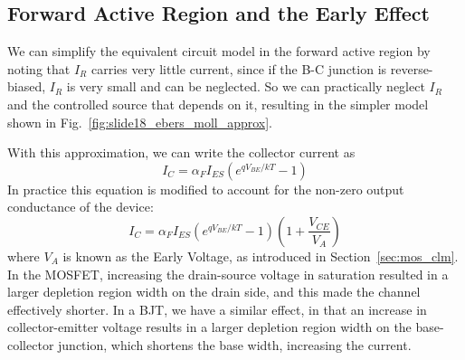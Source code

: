 \subsection{Forward Active Region and the Early Effect}

We can simplify the equivalent circuit model in the forward active region by noting that $I_R$ carries very little current, since if the B-C junction is reverse-biased, $I_R$ is very small and can be neglected.  So we can practically neglect $I_R$ and the controlled source that depends on it, resulting in the simpler model shown in Fig.~\ref{fig:slide18_ebers_moll_approx}.

With this approximation, we can write the collector current as
%
\begin{equation}
	I_C = \alpha_F I_{ES} \left( e^{qV_{BE}/kT} -1 \right)
\end{equation}
%
In practice this equation is modified to account for the non-zero output conductance of the device:
%
\begin{equation}
	I_C = \alpha_F I_{ES} \left( e^{qV_{BE}/kT} -1 \right) \left( 1 + \frac{V_{CE}}{V_A} \right)
\end{equation}
%
where $V_A$ is known as the Early Voltage, as introduced in Section~\ref{sec:mos_clm}.  In the MOSFET, increasing the drain-source voltage in saturation resulted in a larger depletion region width on the drain side, and this made the channel effectively shorter.  In a BJT, we have a similar effect, in that an increase in collector-emitter voltage results in a larger depletion region width on the base-collector junction, which shortens the base width, increasing the current.


